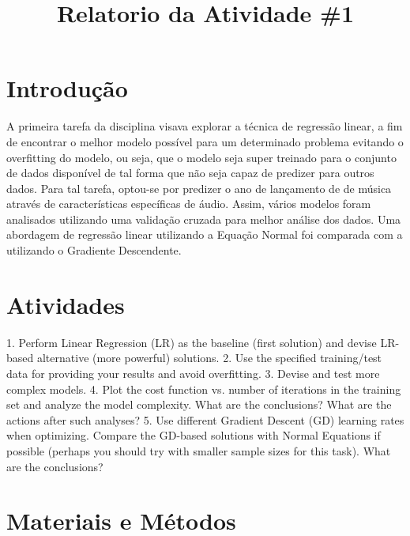 \documentclass[conference]{IEEEtran}
\begin{document}
\title{Relatorio da Atividade \#1}

\author{
\and
{}
}

\maketitle

\section{Introdução}

A primeira tarefa da disciplina visava explorar a técnica de regressão linear, a fim de encontrar o melhor modelo possível para um determinado problema evitando o overfitting do modelo, ou seja, que o modelo seja super treinado para o conjunto de dados disponível de tal forma que não seja capaz de predizer para outros dados. Para tal tarefa, optou-se por predizer o ano de lançamento de de música através de características específicas de áudio. Assim, vários modelos foram analisados utilizando uma validação cruzada para melhor análise dos dados. Uma abordagem de regressão linear utilizando a Equação Normal foi comparada com a utilizando o Gradiente Descendente.

\section{Atividades}

1. Perform Linear Regression (LR) as the baseline (first solution) and devise LR-based alternative (more
powerful) solutions.
2. Use the specified training/test data for providing your results and avoid overfitting.
3. Devise and test more complex models.
4. Plot the cost function vs. number of iterations in the training set and analyze the model complexity.
What are the conclusions? What are the actions after such analyses?
5. Use different Gradient Descent (GD) learning rates when optimizing. Compare the GD-based solutions
with Normal Equations if possible (perhaps you should try with smaller sample sizes for this task).
What are the conclusions?

\section{Materiais e Métodos}
\end{document}
